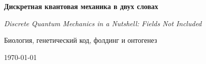 \begin{titlepage}
  \centering
  \vspace*{2cm}
  {\LARGE\bfseries Дискретная квантовая механика в двух словах\par}
  \vspace{0.35cm}
  {\normalsize\itshape Discrete Quantum Mechanics in a Nutshell: Fields Not Included\par}
  \vspace{0.8cm}
  {\Large Биология, генетический код, фолдинг и онтогенез\par}
  \vfill
  {\large \today\par}
\end{titlepage}
\clearpage

\clearpage
\tableofcontents
\clearpage
